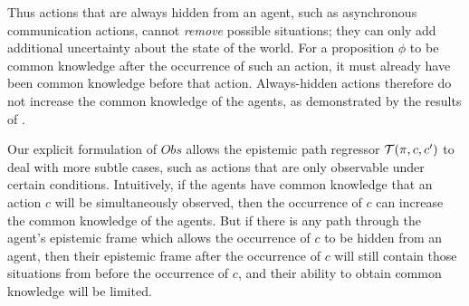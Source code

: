 Thus actions that are always hidden from an agent, such as asynchronous
communication actions, cannot \emph{remove} possible situations; they
can only add additional uncertainty about the state of the world.
For a proposition $\phi$ to be common knowledge after the occurrence
of such an action, it must already have been common knowledge before
that action. Always-hidden actions therefore do not increase the common
knowledge of the agents, as demonstrated by the results of \citep{halpern90knowledge_distrib}.

Our explicit formulation of $Obs$ allows the epistemic path regressor
$\mathcal{T}(\pi,c,c')$ to deal with more subtle cases, such as actions
that are only observable under certain conditions. Intuitively, if
the agents have common knowledge that an action $c$ will be simultaneously
observed, then the occurrence of $c$ can increase the common knowledge
of the agents. But if there is any path through the agent's epistemic
frame which allows the occurrence of $c$ to be hidden from an agent,
then their epistemic frame after the occurrence of $c$ will still
contain those situations from before the occurrence of $c$, and their
ability to obtain common knowledge will be limited.\\


